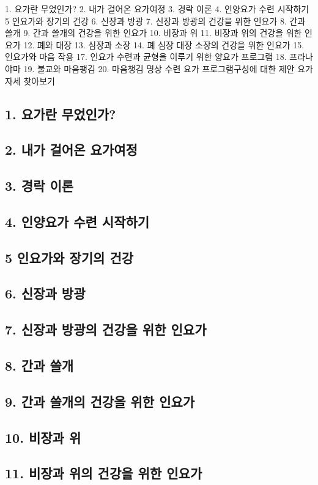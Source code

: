 \documentclass[12pt, a4paper, oneside]{book}
\begin{document}
1. 요가란 무었인가?
2. 내가 걸어온 요가여정
3. 경락 이론
4. 인양요가 수련 시작하기
5 인요가와 장기의 건강
6. 신장과 방광
7. 신장과 방광의 건강을 위한 인요가
8. 간과 쓸개
9. 간과 쓸개의 건강을 위한 인요가
10. 비장과 위
11. 비장과 위의 건강을 위한 인요가
12. 폐와 대장
13. 심장과 소장
14. 폐 심장 대장 소장의 건강을 위한 인요가
15. 인요가와 마음 작용
17. 인요가 수련과 균형을 이루기 위한 양요가 프로그램
18. 프라나야마
19. 불교와 마음팽김
20. 마음챙김 명상 수련
요가 프로그램구성에 대한 제안
요가 자세 찾아보기


	\subsection{1. 요가란 무었인가?}
	\subsection{2. 내가 걸어온 요가여정}
	\subsection{3. 경락 이론}
	\subsection{4. 인양요가 수련 시작하기}
	\subsection{5 인요가와 장기의 건강}
	\subsection{6. 신장과 방광}
	\subsection{7. 신장과 방광의 건강을 위한 인요가}
	\subsection{8. 간과 쓸개}
	\subsection{9. 간과 쓸개의 건강을 위한 인요가}
	\subsection{10. 비장과 위}
	\subsection{11. 비장과 위의 건강을 위한 인요가}
\end{document}
